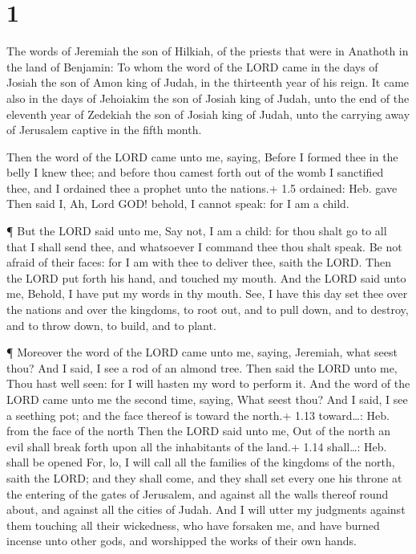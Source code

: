 \hypertarget{section}{%
\section{1}\label{section}}

 The words of Jeremiah the son of Hilkiah, of the priests
that were in Anathoth in the land of Benjamin:  To whom the
word of the LORD came in the days of Josiah the son of Amon king of
Judah, in the thirteenth year of his reign.  It came also in
the days of Jehoiakim the son of Josiah king of Judah, unto the end of
the eleventh year of Zedekiah the son of Josiah king of Judah, unto the
carrying away of Jerusalem captive in the fifth month.

 Then the word of the LORD came unto me, saying,
 Before I formed thee in the belly I knew thee; and before
thou camest forth out of the womb I sanctified thee, and I ordained thee
a prophet unto the nations.+ 1.5 ordained: Heb. gave  Then
said I, Ah, Lord GOD! behold, I cannot speak: for I am a child.

 ¶ But the LORD said unto me, Say not, I am a child: for
thou shalt go to all that I shall send thee, and whatsoever I command
thee thou shalt speak.  Be not afraid of their faces: for I
am with thee to deliver thee, saith the LORD.  Then the LORD
put forth his hand, and touched my mouth. And the LORD said unto me,
Behold, I have put my words in thy mouth.  See, I have this
day set thee over the nations and over the kingdoms, to root out, and to
pull down, and to destroy, and to throw down, to build, and to plant.

 ¶ Moreover the word of the LORD came unto me, saying,
Jeremiah, what seest thou? And I said, I see a rod of an almond tree.
 Then said the LORD unto me, Thou hast well seen: for I
will hasten my word to perform it.  And the word of the
LORD came unto me the second time, saying, What seest thou? And I said,
I see a seething pot; and the face thereof is toward the north.+ 1.13
toward\ldots: Heb. from the face of the north  Then the
LORD said unto me, Out of the north an evil shall break forth upon all
the inhabitants of the land.+ 1.14 shall\ldots: Heb. shall be opened
 For, lo, I will call all the families of the kingdoms of
the north, saith the LORD; and they shall come, and they shall set every
one his throne at the entering of the gates of Jerusalem, and against
all the walls thereof round about, and against all the cities of Judah.
 And I will utter my judgments against them touching all
their wickedness, who have forsaken me, and have burned incense unto
other gods, and worshipped the works of their own hands.

